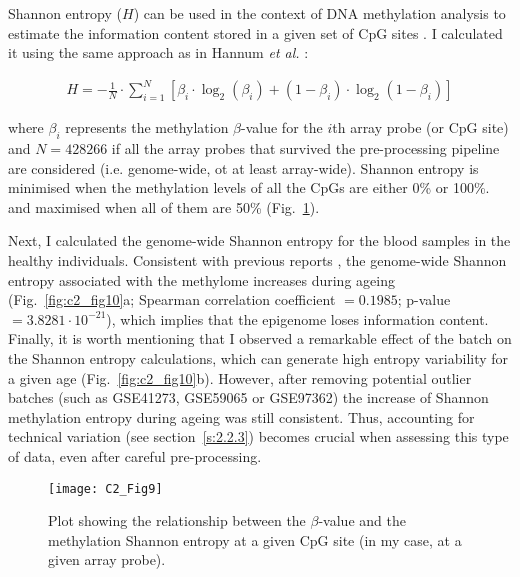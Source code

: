 \smallskip

Shannon entropy ($H$) can be used in the context of DNA methylation analysis to estimate the information content stored in a given set of CpG sites \cite{Slieker2016,Hannum2013,Wang2017,Xie2011,Jenkinson2017}. I calculated it using the same approach as in Hannum \textit{et al.} \cite{Hannum2013}:

\begin{align}
H = - \frac{1}{N} \cdot \sum_{i=1}^{N}[\beta_i \cdot \log_2(\beta_i) + (1-\beta_i) \cdot \log_2(1-\beta_i)]
\end{align}

where $\beta_i$ represents the methylation $\beta$-value for the $i$th array probe (or CpG site) and $N=428266$ if all the array probes that survived the pre-processing pipeline are considered (i.e. genome-wide, ot at least array-wide). Shannon entropy is minimised when the methylation levels of all the CpGs are either 0\% or 100\%. and maximised when all of them are 50\% (Fig.~\ref{fig:c2_fig9}).

\bigskip

Next, I calculated the genome-wide  Shannon entropy for the blood samples in the healthy individuals. Consistent with previous reports \cite{Slieker2016,Hannum2013,Wang2017,Jenkinson2017},  the genome-wide Shannon entropy associated with the methylome increases during ageing (Fig.~\ref{fig:c2_fig10}a; Spearman correlation coefficient $= 0.1985$; p-value $= 3.8281 \cdot 10^{-21}$), which implies that the epigenome loses information content. Finally, it is worth mentioning that I observed a remarkable effect of the batch on the Shannon entropy calculations, which can generate high entropy variability for a given age (Fig.~\ref{fig:c2_fig10}b). However, after removing potential outlier batches (such as GSE41273, GSE59065 or GSE97362) the increase of Shannon methylation entropy during ageing was still consistent. Thus, accounting for technical variation (see section~\ref{s:2.2.3}) becomes crucial when assessing this type of data, even after careful pre-processing. 

\begin{figure}[htbp!] 
	\centering
	\vspace*{3mm}    
	\texttt{[image: C2\_Fig9]}
	\caption[Relationship between the $\beta$-value and the Shannon entropy at a given CpG site]{Plot showing the relationship between the $\beta$-value and the methylation Shannon entropy at a given CpG site (in my case, at a given array probe).}
	\label{fig:c2_fig9}
\end{figure}

